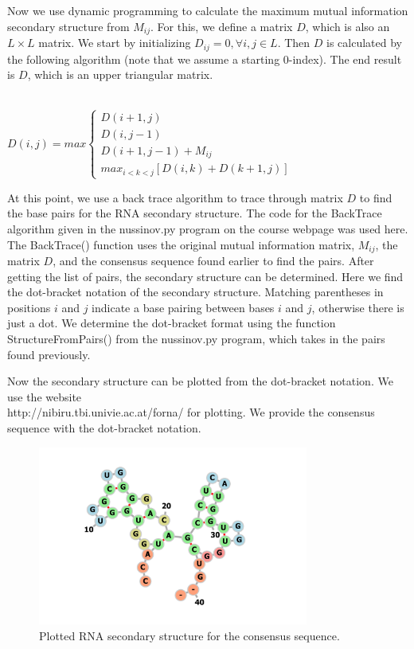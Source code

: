 \documentclass{acm_proc_article-sp}
\begin{document}
Now we use dynamic programming to calculate the maximum mutual information secondary structure from $M_{ij}$.  For this, we define a matrix $D$, which is also an $L \times L$ matrix.  We start by initializing $D_{ij} = 0,  \forall i,j \in L$.  Then $D$ is calculated by the following algorithm (note that we assume a starting 0-index).  The end result is $D$, which is an upper triangular matrix.
\begin{algorithmic}
	 \\
		 \State $D(i,j) = max\left\{
		\begin{array}{ll}
		D(i+1,j) \\
		D(i, j-1) \\
		D(i+1,j-1) + M_{ij} \\
		max_{i<k<j}[D(i,k) + D(k+1, j)]
		\end{array}
		\right.$
	\EndFor
\EndFor
\end{algorithmic}
  
At this point, we use a back trace algorithm to trace through matrix $D$ to find the base pairs for the RNA secondary structure.  The code for the BackTrace algorithm given in the nussinov.py program on the course webpage was used here. The BackTrace() function uses the original mutual information matrix, $M_{ij}$, the matrix $D$, and the consensus sequence found earlier to find the pairs.  After getting the list of pairs, the secondary structure can be determined.  Here we find the dot-bracket notation of the secondary structure.  Matching parentheses in positions $i$ and $j$ indicate a base pairing between bases $i$ and $j$, otherwise there is just a dot.  We determine the dot-bracket format using the function StructureFromPairs() from the nussinov.py program, which takes in the pairs found previously.  

Now the secondary structure can be plotted from the dot-bracket notation.  We use the website \\ http://nibiru.tbi.univie.ac.at/forna/ for plotting.  We provide the consensus sequence with the dot-bracket notation.  

\begin{figure}[!b]
	\includegraphics[trim={0 0 2cm 0}, clip,width=3.5in]{rna.png}
	\caption{Plotted RNA secondary structure for the consensus sequence.}
	\label{fig:hist}
\end{figure}
\end{document}
